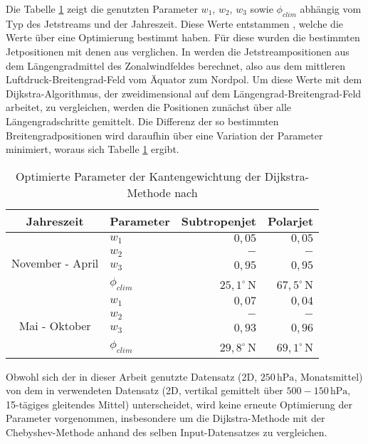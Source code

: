 Die Tabelle \ref{tab:dijkstra} zeigt die genutzten Parameter $w_1$, $w_2$, $w_3$ sowie $\phi_{clim}$ abhängig vom Typ des Jetstreams und der Jahreszeit. Diese Werte entstammen \citet{molnos-2017}, welche die Werte über eine Optimierung bestimmt haben. Für diese wurden die bestimmten Jetpositionen mit denen aus \citet{rikus-2015} verglichen. In \citet{rikus-2015} werden die Jetstreampositionen aus dem Längengradmittel des Zonalwindfeldes berechnet, also aus dem mittleren Luftdruck-Breitengrad-Feld vom Äquator zum Nordpol. Um diese Werte mit dem Dijkstra-Algorithmus, der zweidimensional auf dem Längengrad-Breitengrad-Feld arbeitet, zu vergleichen, werden die Positionen zunächst über alle Längengradschritte gemittelt. Die Differenz der so bestimmten Breitengradpositionen wird daraufhin über eine Variation der Parameter minimiert, woraus sich Tabelle \ref{tab:dijkstra} ergibt.

\begin{table}[htb]
  \caption[Parameter der Kantengewichtung der Dijkstra-Methode]{Optimierte Parameter der Kantengewichtung der Dijkstra-Methode nach \citet{molnos-2017}}
\centering
\begin{tabular}{|cl|rr|}
  \hline
  Jahreszeit & Parameter & Subtropenjet & Polarjet \\
  \hline
  \multirow{4}{*}{November - April} 
    & $w_1$ & $0,05$ & $0,05$ \\
    & $w_2$ & $-$ & $-$ \\
    & $w_3$ & $0,95$ & $0,95$ \\
    & $\phi_{clim}$ & $25,1^{\circ}$\,N & $67,5^{\circ}$\,N \\
  \hline
  \multirow{4}{*}{Mai - Oktober} 
    & $w_1$ & $0,07$ & $0,04$ \\
    & $w_2$ & $-$ & $-$ \\
    & $w_3$ & $0,93$ & $0,96$ \\
    & $\phi_{clim}$ & $29,8^{\circ}$\,N & $69,1^{\circ}$\,N \\
  \hline
\end{tabular}
\label{tab:dijkstra}
\end{table}

Obwohl sich der in dieser Arbeit genutzte Datensatz (2D, $250\,\text{hPa}$, Monatsmittel) von dem in \citet{molnos-2017} verwendeten Datensatz (2D, vertikal gemittelt über $500-150\,\text{hPa}$, 15-tägiges gleitendes Mittel) unterscheidet, wird keine erneute Optimierung der Parameter vorgenommen, insbesondere um die Dijkstra-Methode mit der Chebyshev-Methode anhand des selben Input-Datensatzes zu vergleichen. 

